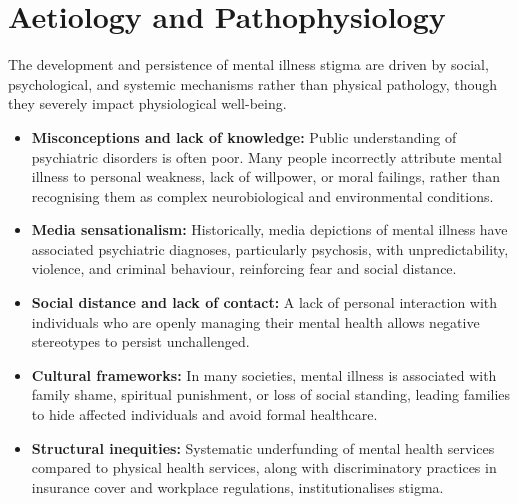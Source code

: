 \section*{Aetiology and Pathophysiology}
The development and persistence of mental illness stigma are driven by social, psychological, and systemic mechanisms rather than physical pathology, though they severely impact physiological well-being.
\begin{itemize}
    \item \textbf{Misconceptions and lack of knowledge:} Public understanding of psychiatric disorders is often poor. Many people incorrectly attribute mental illness to personal weakness, lack of willpower, or moral failings, rather than recognising them as complex neurobiological and environmental conditions.
    \item \textbf{Media sensationalism:} Historically, media depictions of mental illness have associated psychiatric diagnoses, particularly psychosis, with unpredictability, violence, and criminal behaviour, reinforcing fear and social distance.
    \item \textbf{Social distance and lack of contact:} A lack of personal interaction with individuals who are openly managing their mental health allows negative stereotypes to persist unchallenged.
    \item \textbf{Cultural frameworks:} In many societies, mental illness is associated with family shame, spiritual punishment, or loss of social standing, leading families to hide affected individuals and avoid formal healthcare.
    \item \textbf{Structural inequities:} Systematic underfunding of mental health services compared to physical health services, along with discriminatory practices in insurance cover and workplace regulations, institutionalises stigma.
\end{itemize}

